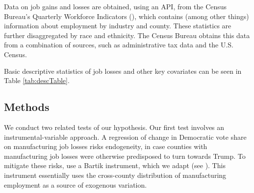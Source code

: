 \documentclass[]{AEA}
\begin{document}
Data on job gains and losses are obtained, using an API, from the Census
Bureau's Quarterly Workforce Indicators (\cite{QWI}), which contains
(among other things) information about employment by industry and
county. These statistics are further disaggregated by race and
ethnicity. The Census Bureau obtains this data from a combination of
sources, such as administrative tax data and the U.S. Census.

Basic descriptive statistics of job losses and other key covariates can
be seen in Table \ref{tab:descTable}. \FloatBarrier

\begin{table}[!h]

\caption{\label{tab:descTable}Manufacturing Job Changes 2004-2015}
\centering
{}
\end{table}
\FloatBarrier

\subsection{Methods} 
\label{methodssec}

We conduct two related tests of our hypothesis. Our first test involves
an instrumental-variable approach. A regression of change in Democratic
vote share on manufacturing job losses risks endogeneity, in case
counties with manufacturing job losses were otherwise predisposed to
turn towards Trump. To mitigate these risks, \cite{Baccini21} use a
Bartik instrument, which we adapt (see \cite{Bartik91}). This instrument
essentially uses the cross-county distribution of manufacturing
employment as a source of exogenous variation.
\end{document}
